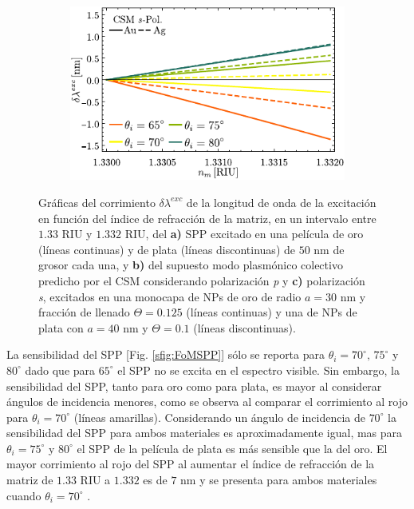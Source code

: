 \begin{figure}[h!]
	\begin{subfigure}{.45\linewidth}\centering
	\includegraphics[scale=1]{2-Resultados/figs/11-SPPCSM/6_Sens_h20_CSMS.pdf}\end{subfigure}\vspace*{-.5em}
	\caption{Gráficas del corrimiento $\delta\lambda^{exc}$ de la longitud de onda de la excitación  en función del índice de refracción de la matriz, en un intervalo entre $1.33$ RIU y $1.332$ RIU, del \textbf{a)} SPP excitado en una película de oro (líneas continuas) y de plata (líneas discontinuas) de $50$ nm de grosor cada una, y  \textbf{b)} del supuesto modo  plasmónico colectivo predicho por el CSM considerando polarización \emph{p} y \textbf{c)}  polarización \emph{s}, excitados en una monocapa de NPs de oro de radio $a=30$ nm y fracción de llenado $\Theta=0.125$ (líneas continuas) y una de NPs de plata con $a=40$ nm y $\Theta=0.1$ (líneas discontinuas).}\label{fig:FoMSPPCSM}
	\end{figure}	

La sensibilidad del SPP [Fig. \ref{sfig:FoMSPP}] sólo se reporta para $\theta_i=70^\circ,\, 75^\circ$ y $80^\circ$ dado que para $65^\circ$ el SPP no se excita en el espectro visible. Sin embargo, la sensibilidad del SPP, tanto para oro como para plata, es mayor al considerar ángulos de incidencia  menores, como se observa al comparar el corrimiento al rojo para $\theta_i=70^\circ$ (líneas amarillas).  Considerando un ángulo de incidencia de $70^\circ$ la sensibilidad del SPP para ambos materiales es aproximadamente igual, mas para $\theta_i=75^\circ$ y $80^\circ$ el SPP de la película de plata es más sensible que la del oro. El mayor corrimiento al rojo del SPP al aumentar  el índice de refracción de la matriz  de $1.33$ RIU a $1.332$ es de $7$ nm y se presenta para ambos materiales cuando $\theta_i=70^\circ$  .

